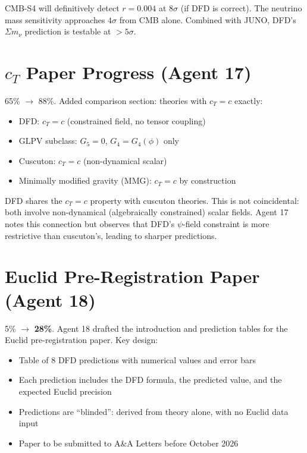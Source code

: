 \documentclass[11pt,a4paper]{article}
\begin{document}
CMB-S4 will definitively detect $r = 0.004$ at $8\sigma$ (if DFD is correct). The neutrino mass sensitivity approaches $4\sigma$ from CMB alone. Combined with JUNO, DFD's $\Sigma m_\nu$ prediction is testable at $> 5\sigma$.

\section{$c_T$ Paper Progress (Agent 17)}

65\% $\to$ 88\%. Added comparison section: theories with $c_T = c$ exactly:
\begin{itemize}[nosep]
\item DFD: $c_T = c$ (constrained field, no tensor coupling)
\item GLPV subclass: $G_5 = 0$, $G_4 = G_4(\phi)$ only
\item Cuscuton: $c_T = c$ (non-dynamical scalar)
\item Minimally modified gravity (MMG): $c_T = c$ by construction
\end{itemize}

DFD shares the $c_T = c$ property with cuscuton theories. This is not coincidental: both involve non-dynamical (algebraically constrained) scalar fields. Agent 17 notes this connection but observes that DFD's $\psi$-field constraint is more restrictive than cuscuton's, leading to sharper predictions.

\section{Euclid Pre-Registration Paper (Agent 18)}

5\% $\to$ \textbf{28\%}. Agent 18 drafted the introduction and prediction tables for the Euclid pre-registration paper. Key design:
\begin{itemize}[nosep]
\item Table of 8 DFD predictions with numerical values and error bars
\item Each prediction includes the DFD formula, the predicted value, and the expected Euclid precision
\item Predictions are ``blinded'': derived from theory alone, with no Euclid data input
\item Paper to be submitted to A\&A Letters before October 2026
\end{itemize}
\end{document}
